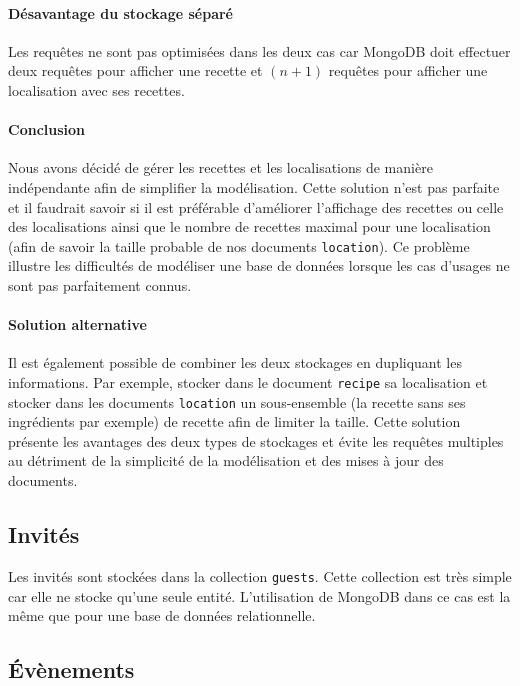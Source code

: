 		\paragraph{Désavantage du stockage séparé}%
			Les requêtes ne sont pas optimisées dans les deux cas car MongoDB doit effectuer deux requêtes pour afficher une recette et $(n+1)$ requêtes pour afficher une localisation avec ses recettes.

		\paragraph{Conclusion}%
			Nous avons décidé de gérer les recettes et les localisations de manière indépendante afin de simplifier la modélisation. Cette solution n'est pas parfaite et il faudrait savoir si il est préférable d'améliorer l'affichage des recettes ou celle des localisations ainsi que le nombre de recettes maximal pour une localisation (afin de savoir la taille probable de nos documents \verb|location|). Ce problème illustre les difficultés de modéliser une base de données lorsque les cas d'usages ne sont pas parfaitement connus.

		\paragraph{Solution alternative}%
			Il est également possible de combiner les deux stockages en dupliquant les informations. Par exemple, stocker dans le document \verb|recipe| sa localisation et stocker dans les documents \verb|location| un sous-ensemble (la recette sans ses ingrédients par exemple) de recette afin de limiter la taille. Cette solution présente les avantages des deux types de stockages et évite les requêtes multiples au détriment de la simplicité de la modélisation et des mises à jour des documents.

	\subsection{Invités}

		Les invités sont stockées dans la collection \verb|guests|. Cette collection est très simple car elle ne stocke qu'une seule entité. L'utilisation de MongoDB dans ce cas est la même que pour une base de données relationnelle.

	\subsection{Évènements}

